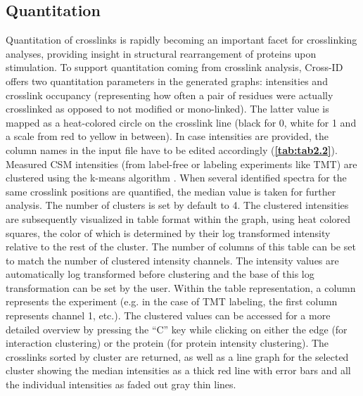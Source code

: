 \subsection{Quantitation}
Quantitation of crosslinks is rapidly becoming an important facet for crosslinking analyses, providing insight in structural rearrangement of proteins upon stimulation. To support quantitation coming from crosslink analysis, Cross-ID offers two quantitation parameters in the generated graphs: intensities and crosslink occupancy (representing how often a pair of residues were actually crosslinked as opposed to not modified or mono-linked). The latter value is mapped as a heat-colored circle on the crosslink line (black for 0, white for 1 and a scale from red to yellow in between). In case intensities are provided, the column names in the input file have to be edited accordingly (\textbf{\autoref{tab:tab2.2}}). Measured CSM intensities (from label-free or labeling experiments like TMT) are clustered using the k-means algorithm \cite{jain1900data}. When several identified spectra for the same crosslink positions are quantified, the median value is taken for further analysis. The number of clusters is set by default to 4. The clustered intensities are subsequently visualized in table format within the graph, using heat colored squares, the color of which is determined by their log transformed intensity relative to the rest of the cluster. The number of columns of this table can be set to match the number of clustered intensity channels. The intensity values are automatically log transformed before clustering and the base of this log transformation can be set by the user. Within the table representation, a column represents the experiment (e.g. in the case of TMT labeling, the first column represents channel 1, etc.). The clustered values can be accessed for a more detailed overview by pressing the “C” key while clicking on either the edge (for interaction clustering) or the protein (for protein intensity clustering). The crosslinks sorted by cluster are returned, as well as a line graph for the selected cluster showing the median intensities as a thick red line with error bars and all the individual intensities as faded out gray thin lines.
